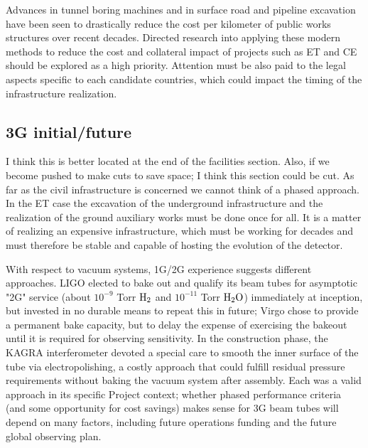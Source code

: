 Advances in tunnel boring machines and in surface road and pipeline excavation have been seen to drastically reduce the cost per kilometer of public works structures over recent decades. Directed research into applying these modern methods to reduce the cost and collateral impact of projects such as ET and CE should be explored as a high priority. 
Attention must be also paid to the legal aspects specific to each candidate countries, which could impact the timing of the infrastructure realization. 

\subsection{3G initial/future}

I think this is better located at the end of the facilities section.  Also, if we become pushed to make cuts to save space; I think this section could be cut. 
As far as the civil infrastructure is concerned we cannot think of a phased approach. In the ET case the excavation of the underground infrastructure and the realization of the ground auxiliary works must be done once for all. It is a matter of realizing an expensive infrastructure, which must be working for decades and must therefore be stable  and capable of hosting the evolution of the detector.

With respect to vacuum systems, 1G/2G experience suggests different approaches. LIGO elected to bake out and qualify its beam tubes for asymptotic "2G" service (about $10^{-9}$ Torr $\rm H_2$ and $10^{-11} $ Torr $\rm H_2O$) immediately at inception, but invested in no durable means to repeat this in future; Virgo chose to provide a permanent bake capacity, but to delay the expense of exercising the bakeout until it is required for observing sensitivity. In the construction phase, the  KAGRA interferometer devoted  a special care to smooth   the inner surface of the tube via electropolishing, a costly approach that could fulfill  residual pressure requirements without baking the vacuum system  after assembly.  Each was a valid approach in its specific Project context; whether phased performance criteria (and some opportunity for cost savings) makes sense for 3G beam tubes will depend on many factors, including future operations funding and the future global observing plan.  


